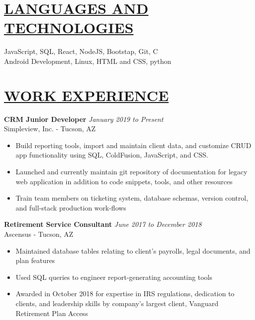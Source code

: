 \documentclass[10pt]{res} %
\begin{document}
 
 
\address{Tucson, AZ $|$ xmclallen@gmail.com $|$ (910) 916-0948}        
         
                        
\begin{resume}                         

\section{\underline{LANGUAGES AND TECHNOLOGIES}}
\vspace{4pt}
  	JavaScript, SQL, React, NodeJS, Bootstap, Git, C\\
  	Android Development, Linux, HTML and CSS, python


\section{\underline{WORK EXPERIENCE}}
\vspace{4pt}
  {\bf CRM Junior Developer} \hfill{\sl January 2019 to Present}\\
  Simpleview, Inc. - Tucson, AZ
  
   \begin{itemize} %
   \item Build reporting tools, import and maintain client data, and customize CRUD app functionality using SQL, ColdFusion, JavaScript, and CSS.
   \item Launched and currently maintain git repository of documentation for legacy web application in addition to code snippets, tools, and other resources
   \item Train team members on ticketing system, database schemas, version control, and full-stack production work-flows
   \end{itemize}


  {\bf Retirement Service Consultant} \hfill  {\sl June 2017 to December 2018}\\
  Ascensus - Tucson, AZ
  
   \begin{itemize} %
   \item Maintained database tables relating to client’s payrolls, legal documents, and plan features
   \item Used SQL queries to engineer report-generating accounting tools
   \item Awarded in October 2018 for expertise in IRS regulations, dedication to clients, and leadership skills by company's largest client, Vanguard Retirement Plan Access
   \end{itemize}



\end{resume}
\end{document}
